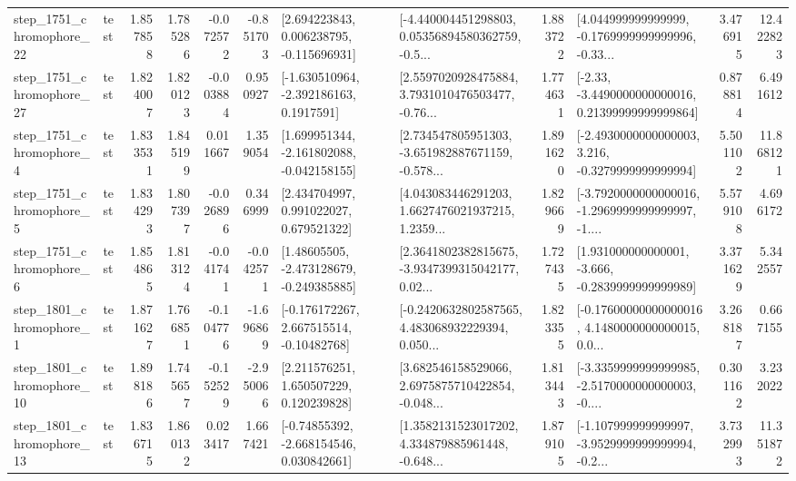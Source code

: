 \begin{tabular}{llrrrrllrlrr}
 step\_1751\_chromophore\_22 &      test &      1.857858 &    1.785286 &     -0.072572 & -0.851703 &    [2.694223843, 0.006238795, -0.115696931] &  [-4.440004451298803, 0.05356894580362759, -0.5... &       1.883722 &  [4.044999999999999, -0.1769999999999996, -0.33... &            3.476915 &         12.422823 \\
 step\_1751\_chromophore\_27 &      test &      1.824007 &    1.820123 &     -0.003884 &  0.950927 &     [-1.630510964, -2.392186163, 0.1917591] &  [2.5597020928475884, 3.7931010476503477, -0.76... &       1.774631 &  [-2.33, -3.4490000000000016, 0.21399999999999864] &            0.878814 &          6.491612 \\
  step\_1751\_chromophore\_4 &      test &      1.833531 &    1.845199 &      0.011667 &  1.359054 &   [1.699951344, -2.161802088, -0.042158155] &  [2.734547805951303, -3.651982887671159, -0.578... &       1.891620 &  [-2.4930000000000003, 3.216, -0.3279999999999994] &            5.501102 &         11.868121 \\
  step\_1751\_chromophore\_5 &      test &      1.834293 &    1.807397 &     -0.026896 &  0.346999 &     [2.434704997, 0.991022027, 0.679521322] &  [4.043083446291203, 1.6627476021937215, 1.2359... &       1.829669 &  [-3.7920000000000016, -1.2969999999999997, -1.... &            5.579108 &          4.696172 \\
  step\_1751\_chromophore\_6 &      test &      1.854865 &    1.813124 &     -0.041741 & -0.042571 &    [1.48605505, -2.473128679, -0.249385885] &  [2.3641802382815675, -3.9347399315042177, 0.02... &       1.727435 &   [1.931000000000001, -3.666, -0.2839999999999989] &            3.371629 &          5.342557 \\
  step\_1801\_chromophore\_1 &      test &      1.871627 &    1.766851 &     -0.104776 & -1.696869 &    [-0.176172267, 2.667515514, -0.10482768] &  [-0.2420632802587565, 4.483068932229394, 0.050... &       1.823355 &  [-0.17600000000000016, 4.1480000000000015, 0.0... &            3.268187 &          0.667155 \\
 step\_1801\_chromophore\_10 &      test &      1.898186 &    1.745657 &     -0.152529 & -2.950066 &     [2.211576251, 1.650507229, 0.120239828] &  [3.682546158529066, 2.6975875710422854, -0.048... &       1.813443 &  [-3.3359999999999985, -2.5170000000000003, -0.... &            0.301162 &          3.232022 \\
 step\_1801\_chromophore\_13 &      test &      1.836715 &    1.860132 &      0.023417 &  1.667421 &    [-0.74855392, -2.668154546, 0.030842661] &  [1.3582131523017202, 4.334879885961448, -0.648... &       1.879105 &  [-1.107999999999997, -3.9529999999999994, -0.2... &            3.732993 &         11.351872 \\

\end{tabular}
